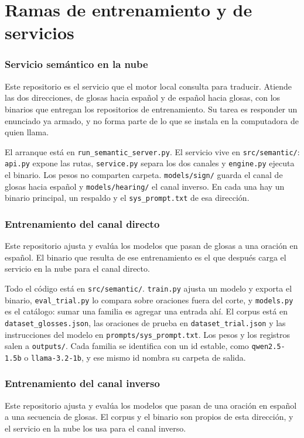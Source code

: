 \chapter{Ramas de entrenamiento y de servicios}
\label{ap:ramas}

\subsection{Servicio semántico en la nube}
Este repositorio es el servicio que el motor local consulta para traducir. Atiende las dos direcciones, de glosas hacia español y de español hacia glosas, con los binarios que entregan los repositorios de entrenamiento. Su tarea es responder un enunciado ya armado, y no forma parte de lo que se instala en la computadora de quien llama.

El arranque está en \texttt{run\_semantic\_server.py}. El servicio vive en \texttt{src/semantic/}: \texttt{api.py} expone las rutas, \texttt{service.py} separa los dos canales y \texttt{engine.py} ejecuta el binario. Los pesos no comparten carpeta. \texttt{models/sign/} guarda el canal de glosas hacia español y \texttt{models/hearing/} el canal inverso. En cada una hay un binario principal, un respaldo y el \texttt{sys\_prompt.txt} de esa dirección.

\subsection{Entrenamiento del canal directo}
Este repositorio ajusta y evalúa los modelos que pasan de glosas a una oración en español. El binario que resulta de ese entrenamiento es el que después carga el servicio en la nube para el canal directo.

Todo el código está en \texttt{src/semantic/}. \texttt{train.py} ajusta un modelo y exporta el binario, \texttt{eval\_trial.py} lo compara sobre oraciones fuera del corte, y \texttt{models.py} es el catálogo: sumar una familia es agregar una entrada ahí. El corpus está en \texttt{dataset\_glosses.json}, las oraciones de prueba en \texttt{dataset\_trial.json} y las instrucciones del modelo en \texttt{prompts/sys\_prompt.txt}. Los pesos y los registros salen a \texttt{outputs/}. Cada familia se identifica con un id estable, como \texttt{qwen2.5-1.5b} o \texttt{llama-3.2-1b}, y ese mismo id nombra su carpeta de salida.

\subsection{Entrenamiento del canal inverso}
Este repositorio ajusta y evalúa los modelos que pasan de una oración en español a una secuencia de glosas. El corpus y el binario son propios de esta dirección, y el servicio en la nube los usa para el canal inverso.

